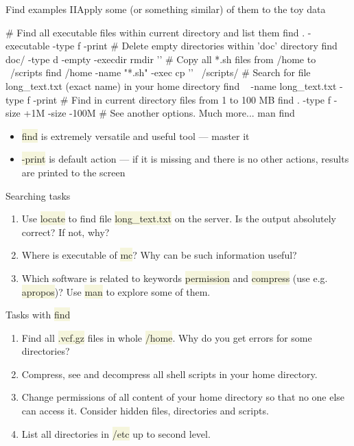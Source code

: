 \documentclass[compress, ucs, xelatex, 11pt, xcolor=svgnames, aspectratio=169,
	hyperref={
		bookmarks=true,
		unicode=true,
		colorlinks=true,
		pdftitle={Linux, command line and MetaCentrum},
		plainpages=false,
		pdfauthor={Vojtech Zeisek},
		pdfsubject={Course about use of Linux command line, writing shell scripts and using MetaCentrum of CESNET},
		pdfcreator={XeLaTeX},
		pdfkeywords={Linux, GNU, BASH, shell, command line, MetaCentrum},
		linkcolor=DarkRed, %
		anchorcolor=DarkBlue, %
		citecolor=Indigo, %
		filecolor=NavyBlue, %
		menucolor=DarkMagenta, %
		urlcolor=DarkBlue, %
		pdftex},
	url={hyphens, lowtilde} %
	]{beamer}
\renewcommand{\texttt}[1]{\colorbox{Beige}{{\ttfamily #1}}}
\begin{document}
\begin{frame}[fragile]{Find examples II}{Apply some (or something similar) of them to the toy data}
	\begin{bashcode}
    # Find all executable files within current directory and list them
    find . -executable -type f -print
    # Delete empty directories within 'doc' directory
    find doc/ -type d -empty -execdir rmdir '{}' \;
    # Copy all *.sh files from /home to ~/scripts
    find /home -name "*.sh" -exec cp '{}' ~/scripts/
    # Search for file long_text.txt (exact name) in your home directory
    find ~ -name long_text.txt -type f -print
    # Find in current directory files from 1 to 100 MB
    find . -type f -size +1M -size -100M
    # See another options. Much more...
    man find
	\end{bashcode}
	\begin{itemize}
		\item \texttt{find} is extremely versatile and useful tool --- master it
		\item \texttt{-print} is default action --- if it is missing and there is no other actions, results are printed to the screen
	\end{itemize}
\end{frame}

\begin{frame}{Searching tasks}
	\begin{enumerate}
		\item Use \texttt{locate} to find file \texttt{long\_text.txt} on the server. Is the output absolutely correct? If not, why?
		\item Where is executable of \texttt{mc}? Why can be such information useful?
		\item Which software is related to keywords \texttt{permission} and \texttt{compress} (use e.g. \texttt{apropos})? Use \texttt{man} to explore some of them.
	\end{enumerate}
	\begin{block}{Tasks with \texttt{find}}
		\begin{enumerate}
			\item Find all \texttt{*.vcf.gz} files in whole \texttt{/home}. Why do you get errors for some directories?
			\item Compress, see and decompress all shell scripts in your home directory.
			\item Change permissions of all content of your home directory so that no one else can access it. Consider hidden files, directories and scripts.
			\item List all directories in \texttt{/etc} up to second level.
		\end{enumerate}
	\end{block}
\end{frame}
\end{document}
